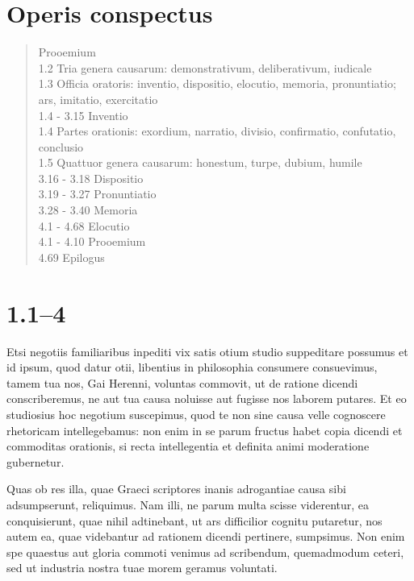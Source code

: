 

\section*{Operis conspectus}
\begin{quotation}
   Prooemium\\
1.2   Tria genera causarum: demonstrativum, deliberativum, iudicale\\
1.3   Officia oratoris: inventio, dispositio, elocutio, memoria, pronuntiatio; ars, imitatio, exercitatio\\
1.4 - 3.15   Inventio\\
1.4   Partes orationis: exordium, narratio, divisio, confirmatio, confutatio, conclusio\\
1.5   Quattuor genera causarum: honestum, turpe, dubium, humile\\
3.16 - 3.18   Dispositio\\
3.19 - 3.27   Pronuntiatio\\
3.28 - 3.40   Memoria\\
4.1 - 4.68   Elocutio\\
4.1 - 4.10   Prooemium\\
4.69   Epilogus
\end{quotation}


\section*{1.1–4}

Etsi negotiis familiaribus inpediti vix satis otium studio suppeditare possumus et id ipsum, quod datur otii, libentius in philosophia consumere consuevimus, tamem tua nos, Gai Herenni, voluntas commovit, ut de ratione dicendi conscriberemus, ne aut tua causa noluisse aut fugisse nos laborem putares. Et eo studiosius hoc negotium suscepimus, quod te non sine causa velle cognoscere rhetoricam intellegebamus: non enim in se parum fructus habet copia dicendi et commoditas orationis, si recta intellegentia et definita animi moderatione gubernetur. 

Quas ob res illa, quae Graeci scriptores inanis adrogantiae causa sibi adsumpserunt, reliquimus. Nam illi, ne parum multa scisse viderentur, ea conquisierunt, quae nihil adtinebant, ut ars difficilior cognitu putaretur, nos autem ea, quae videbantur ad rationem dicendi pertinere, sumpsimus. Non enim spe quaestus aut gloria commoti venimus ad scribendum, quemadmodum ceteri, sed ut industria nostra tuae morem geramus voluntati. 

